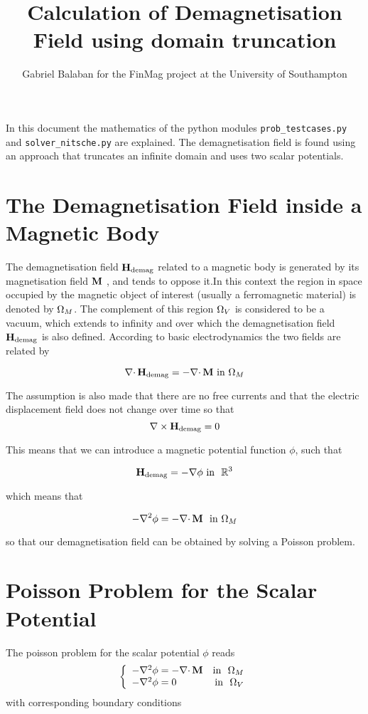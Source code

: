 \documentclass[12pt,a4paper,notitlepage]{article}
\title{Calculation of Demagnetisation Field using domain truncation}
\author{Gabriel Balaban for the FinMag project at the University of Southampton}
\begin{document}
\maketitle
\abstract{}
In this document the mathematics of the python modules \texttt{prob\_testcases.py} and \texttt{solver\_nitsche.py} are explained.
The demagnetisation field is found using an approach that truncates an infinite domain and uses two scalar potentials.

\newpage
\section{The Demagnetisation Field inside a Magnetic Body} 
The demagnetisation field $\mathbf{H}_\mathrm{demag}$ related to a magnetic body is generated by its magnetisation field $\mathbf{M}$ ,
 and tends to oppose it.In this context the region in space occupied by the magnetic object of interest 
(usually a ferromagnetic material) is denoted by  $\Omega_M$.
The complement of this region $\Omega_V$ is considered to be a vacuum, which extends to infinity and over which
the demagnetisation field
$\mathbf{H}_\mathrm{demag} $ is also defined.
According to basic electrodynamics the two fields are related by

\begin{equation}\label{dmagdef} \nabla \cdotp \mathbf{H}_\mathrm{demag} = - \nabla \cdotp \mathbf{M} \  \mbox{in} \ \Omega_M \end{equation}

\noindent The assumption is also made that there are no free currents and that the electric displacement field does not change over time so that
\begin{equation}\label{nocurl}  \nabla \times \mathbf{H}_\mathrm{demag} = 0\end{equation}

\noindent This means that we can introduce a magnetic potential function $\phi$, such that

\[ \dmag = - \nabla \phi \  \mbox{in} \ \ \mathbb{R}^3 \]

\noindent which means that 

\[ - \nabla^2 \phi = -\nabla \cdotp \magn \ \ \mbox{in} \ \omM \]

\noindent so that our demagnetisation field can be obtained by solving a Poisson problem.

\section{Poisson Problem for the Scalar Potential}
The poisson problem for the scalar potential $\phi$ reads
\begin{equation}\label{phidef} 
\left\{
\begin{array}{lr}
- \nabla^2 \phi = - \nabla \cdotp \mathbf{M}  & \mbox{in } \ \Omega_M \\
- \nabla^2 \phi = 0 & \mbox{in } \ \Omega_V 
\end{array}
\right.
\end{equation}
\noindent with corresponding boundary conditions
\end{document}
